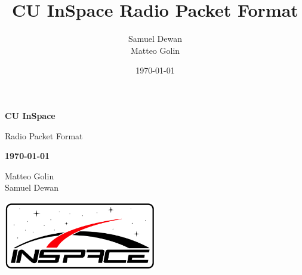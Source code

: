 \documentclass[11pt,letterpaper]{article}
\title{CU InSpace Radio Packet Format}
\author{Samuel Dewan\\Matteo Golin}
\date{\today}
\begin{document}
\begin{titlepage}
    \centering

    {\large \textbf{CU InSpace}}

    {\Huge \sffamily Radio Packet Format}

    {\large \textbf{\today}}

    Matteo Golin \\
    Samuel Dewan

    \includegraphics[width=0.5\textwidth]{logo.png}
\end{titlepage}

\tableofcontents
\clearpage


\clearpage


\clearpage


\clearpage

\printbibliography
\end{document}
